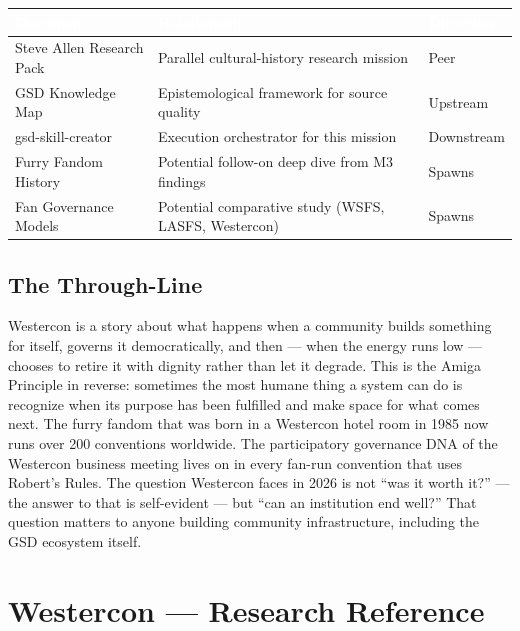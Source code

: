 \documentclass[11pt,letterpaper]{article}
\newcommand{\stageheader}[2]{%
  \noindent\colorbox{#2}{\makebox[\textwidth][l]{%
    \textcolor{white}{\bfseries\sffamily\hspace{6pt}#1\hspace{6pt}}}}%
  \vspace{0.5em}\par%
}
\newcommand{\tableheader}[1]{\textbf{\sffamily\textcolor{white}{#1}}}
\begin{document}
\begin{center}
\begin{tabularx}{\textwidth}{L{4cm}XC{2.5cm}}
\toprule
{}
\tableheader{Document} & \tableheader{Relationship} & \tableheader{Direction} \\
\midrule
Steve Allen Research Pack & Parallel cultural-history research mission & Peer \\
GSD Knowledge Map & Epistemological framework for source quality & Upstream \\
gsd-skill-creator & Execution orchestrator for this mission & Downstream \\
Furry Fandom History & Potential follow-on deep dive from M3 findings & Spawns \\
Fan Governance Models & Potential comparative study (WSFS, LASFS, Westercon) & Spawns \\
\bottomrule
\end{tabularx}
\end{center}

\subsection{The Through-Line}

Westercon is a story about what happens when a community builds something for itself, governs it democratically, and then --- when the energy runs low --- chooses to retire it with dignity rather than let it degrade. This is the Amiga Principle in reverse: sometimes the most humane thing a system can do is recognize when its purpose has been fulfilled and make space for what comes next. The furry fandom that was born in a Westercon hotel room in 1985 now runs over 200 conventions worldwide. The participatory governance DNA of the Westercon business meeting lives on in every fan-run convention that uses Robert's Rules. The question Westercon faces in 2026 is not ``was it worth it?'' --- the answer to that is self-evident --- but ``can an institution end well?'' That question matters to anyone building community infrastructure, including the GSD ecosystem itself.

\newpage

\stageheader{STAGE 2 --- RESEARCH REFERENCE}{secondary}

\section{Westercon --- Research Reference}
\end{document}
